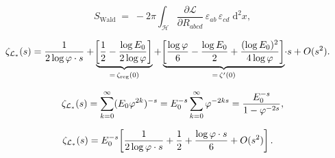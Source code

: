 \begin{equation}
  S_\mathrm{Wald}
  \;=\; -2\pi\int_{\mathcal{H}}
  \frac{\partial\mathcal{L}}{\partial R_{abcd}}\,
  \varepsilon_{ab}\,\varepsilon_{cd}\;\mathrm{d}^2x,
  \label{P10:eq:wald_formula}
\end{equation}

\begin{align}
  \zeta_{\mathcal{L}_*}(s)
  &= \frac{1}{2\log\varphi\cdot s}
  + \underbrace{\!\left[\frac{1}{2} - \frac{\log E_0}{2\log\varphi}\right]}_{=\,\zeta_\mathrm{reg}(0)}
  + \underbrace{\!\left[\frac{\log\varphi}{6} - \frac{\log E_0}{2}
    + \frac{(\log E_0)^2}{4\log\varphi}\right]}_{=\,\zeta'(0)}\!\cdot s
  + O(s^2).
  \label{P10:eq:zeta_coeffs}
\end{align}

\begin{equation}
  \zeta_{\mathcal{L}_*}(s)
  = \sum_{k=0}^{\infty}(E_0\varphi^{2k})^{-s}
  = E_0^{-s}\sum_{k=0}^{\infty}\varphi^{-2ks}
  = \frac{E_0^{-s}}{1-\varphi^{-2s}},
  \label{P10:eq:zeta_derivation}
\end{equation}

\begin{align}
  \zeta_{\mathcal{L}_*}(s)
  &= E_0^{-s}\!\left[\frac{1}{2\log\varphi\cdot s}
   + \frac{1}{2} + \frac{\log\varphi\cdot s}{6} + O(s^2)\right].
  \label{P10:eq:zeta_laurent}
\end{align}

